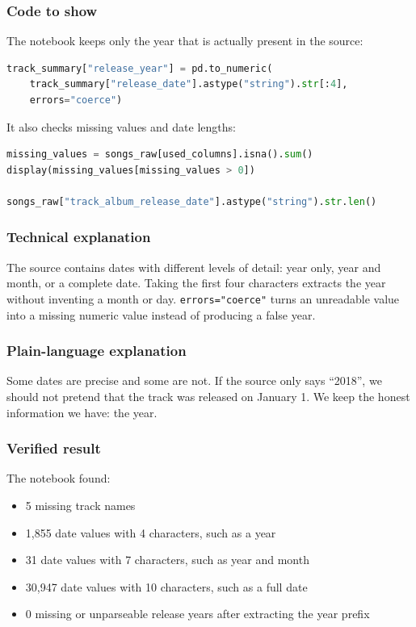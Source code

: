 \documentclass[11pt,a4paper]{article}
\begin{document}
\subsubsection*{Code to show}
The notebook keeps only the year that is actually present in the source:

\begin{lstlisting}[language=Python]
track_summary["release_year"] = pd.to_numeric(
    track_summary["release_date"].astype("string").str[:4],
    errors="coerce")
\end{lstlisting}

It also checks missing values and date lengths:

\begin{lstlisting}[language=Python]
missing_values = songs_raw[used_columns].isna().sum()
display(missing_values[missing_values > 0])

songs_raw["track_album_release_date"].astype("string").str.len()
\end{lstlisting}

\subsubsection*{Technical explanation}
The source contains dates with different levels of detail: year only, year and month, or a complete date. Taking the first four characters extracts the year without inventing a month or day. \texttt{errors="coerce"} turns an unreadable value into a missing numeric value instead of producing a false year.

\subsubsection*{Plain-language explanation}
Some dates are precise and some are not. If the source only says ``2018'', we should not pretend that the track was released on January 1. We keep the honest information we have: the year.

\subsubsection*{Verified result}
The notebook found:

\begin{itemize}[leftmargin=1.5em]
    \item 5 missing track names
    \item 1,855 date values with 4 characters, such as a year
    \item 31 date values with 7 characters, such as year and month
    \item 30,947 date values with 10 characters, such as a full date
    \item 0 missing or unparseable release years after extracting the year prefix
\end{itemize}
\end{document}
